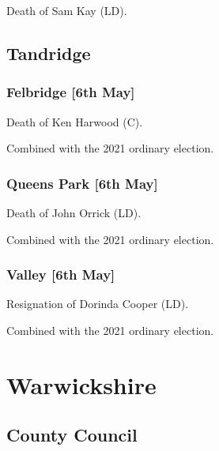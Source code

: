 \documentclass[a4paper,openany]{book}
\begin{document}
\begin{resultsiii}

Death of Sam Kay (LD).

\subsection*{Tandridge}

\subsubsection*{Felbridge \hspace*{\fill}\nolinebreak[1]%
	\enspace\hspace*{\fill}
	[6th May]}


Death of Ken Harwood (C).

Combined with the 2021 ordinary election.

\subsubsection*{Queens Park \hspace*{\fill}\nolinebreak[1]%
	\enspace\hspace*{\fill}
	[6th May]}


Death of John Orrick (LD).

Combined with the 2021 ordinary election.

\subsubsection*{Valley \hspace*{\fill}\nolinebreak[1]%
	\enspace\hspace*{\fill}
	[6th May]}


Resignation of Dorinda Cooper (LD).

Combined with the 2021 ordinary election.

\section{Warwickshire}

\subsection*{County Council}


\end{resultsiii}
\end{document}
